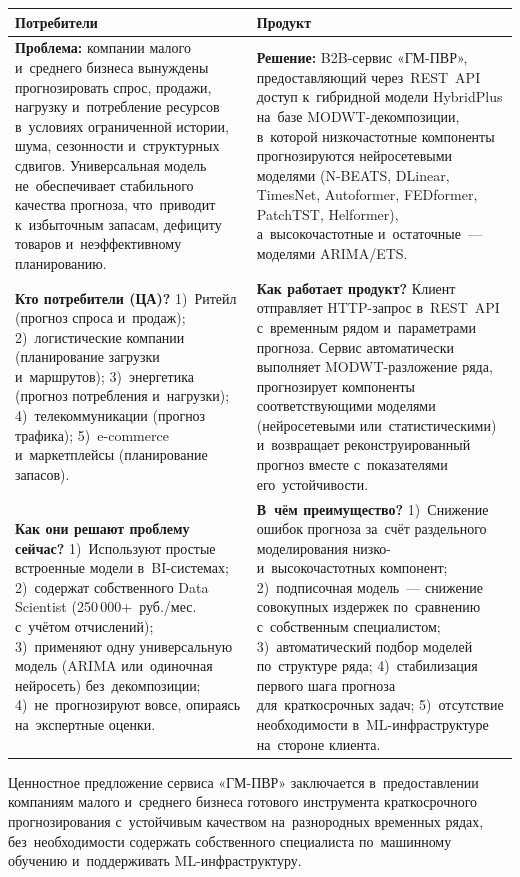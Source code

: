 {\footnotesize
\begin{longtable}{L{7.6cm} L{7.6cm}}
\toprule
\textbf{Потребители} & \textbf{Продукт} \\
\midrule
\endhead
\textbf{Проблема:} компании малого и~среднего бизнеса вынуждены прогнозировать спрос, продажи, нагрузку и~потребление ресурсов в~условиях ограниченной истории, шума, сезонности и~структурных сдвигов. Универсальная модель не~обеспечивает стабильного качества прогноза, что~приводит к~избыточным запасам, дефициту товаров и~неэффективному планированию. & \textbf{Решение:} B2B-сервис «ГМ-ПВР», предоставляющий через~REST~API доступ к~гибридной модели HybridPlus на~базе MODWT-декомпозиции, в~которой низкочастотные компоненты прогнозируются нейросетевыми моделями (N-BEATS, DLinear, TimesNet, Autoformer, FEDformer, PatchTST, Helformer), а~высокочастотные и~остаточные~--- моделями ARIMA/ETS. \\
\midrule
\textbf{Кто потребители (ЦА)?} 1)~Ритейл (прогноз спроса и~продаж); 2)~логистические компании (планирование загрузки и~маршрутов); 3)~энергетика (прогноз потребления и~нагрузки); 4)~телекоммуникации (прогноз трафика); 5)~e-commerce и~маркетплейсы (планирование запасов). & \textbf{Как работает продукт?} Клиент отправляет HTTP-запрос в~REST~API с~временным рядом и~параметрами прогноза. Сервис автоматически выполняет MODWT-разложение ряда, прогнозирует компоненты соответствующими моделями (нейросетевыми или~статистическими) и~возвращает реконструированный прогноз вместе с~показателями его~устойчивости. \\
\midrule
\textbf{Как они решают проблему сейчас?} 1)~Используют простые встроенные модели в~BI-системах; 2)~содержат собственного Data Scientist (250\,000+~руб./мес. с~учётом отчислений); 3)~применяют одну универсальную модель (ARIMA или~одиночная нейросеть) без~декомпозиции; 4)~не~прогнозируют вовсе, опираясь на~экспертные оценки. & \textbf{В~чём преимущество?} 1)~Снижение ошибок прогноза за~счёт раздельного моделирования низко- и~высокочастотных компонент; 2)~подписочная модель~--- снижение совокупных издержек по~сравнению с~собственным специалистом; 3)~автоматический подбор моделей по~структуре ряда; 4)~стабилизация первого шага прогноза для~краткосрочных задач; 5)~отсутствие необходимости в~ML-инфраструктуре на~стороне клиента. \\
\bottomrule
\end{longtable}
}

Ценностное предложение сервиса «ГМ-ПВР» заключается в~предоставлении компаниям
малого и~среднего бизнеса готового инструмента краткосрочного прогнозирования
с~устойчивым качеством на~разнородных временных рядах, без~необходимости
содержать собственного специалиста по~машинному обучению и~поддерживать
ML-инфраструктуру.

